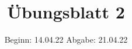 

\title{Übungsblatt 2}
\date{%
  Beginn: 14.04.22
  \hspace{3em}
  Abgabe: 21.04.22
}



\maketitle
\thispagestyle{empty}
\tableofcontents
\newpage






